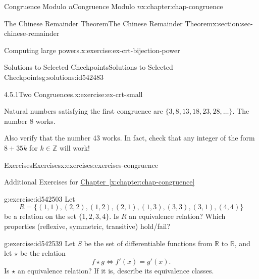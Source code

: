 \documentclass[oneside,10pt,]{book}
\newcommand{\xreffont}{\relax}
\numberwithin{equation}{section}
\begin{document}
\begin{chapterptx}{Congruence Modulo \(n\)}{}{Congruence Modulo \(n\)}{}{}{x:chapter:chap-congruence}
\begin{sectionptx}{The Chinese Remainder Theorem}{}{The Chinese Remainder Theorem}{}{}{x:section:sec-chinese-remainder}
\begin{inlineexercise}{Computing large powers.}{x:exercise:ex-crt-bijection-power}
\end{inlineexercise}%
%
%
\typeout{************************************************}
\typeout{************************************************}
%
\begin{solutions-subsection-numberless}{Solutions to Selected Checkpoints}{}{Solutions to Selected Checkpoints}{}{}{g:solutions:id542483}
\begin{inlinesolution}{4.5.1}{Two Congruences.}{x:exercise:ex-crt-small}%
\par\smallskip%
\noindent\hypertarget{g:solution:id542026-main}{}Natural numbers satisfying the first congruence are \(\{3, 8, 13, 18, 23, 28, \ldots\}\). The number 8 works.%
\par
Also verify that the number 43 works. In fact, check that any integer of the form \(8 + 35k\) for \(k \in \mathbb{Z}\) will work!%
\end{inlinesolution}%
\end{solutions-subsection-numberless}
\end{sectionptx}
%
%
\typeout{************************************************}
\typeout{************************************************}
%
\begin{exercises-section}{Exercises}{}{Exercises}{}{}{x:exercises:exercises-congruence}
\begin{introduction}{}%
Additional Exercises for \hyperref[x:chapter:chap-congruence]{Chapter~{\xreffont\ref{x:chapter:chap-congruence}}}%
\end{introduction}%
\begin{divisionexercise}{1}{}{}{g:exercise:id542503}%
Let%
\begin{equation*}
R = \{(1,1),(2,2),(1,2),(2,1),(1,3),(3,3),(3,1),(4,4)\}
\end{equation*}
be a relation on the set \(\{1,2,3,4\}\). Is \(R\) an equivalence relation? Which properties (reflexive, symmetric, transitive) hold\slash{}fail?%
\end{divisionexercise}%
\begin{divisionexercise}{2}{}{}{g:exercise:id542539}%
Let \(S\) be the set of differentiable functions from \(\mathbb{R}\) to \(\mathbb{R}\), and let \(\star\) be the relation%
\begin{equation*}
f \star g \Leftrightarrow f'(x) = g'(x)\text{.}
\end{equation*}
Is \(\star\) an equivalence relation? If it is, describe its equivalence classes.%
\end{divisionexercise}%

\end{exercises-section}
\end{chapterptx}
\end{document}
